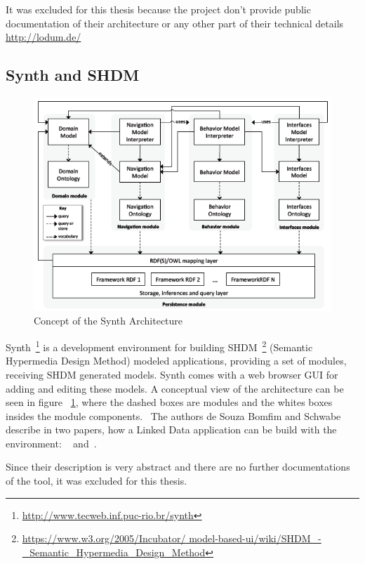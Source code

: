 It was excluded for this thesis because the project don't provide public 
documentation of their architecture or any other part of their technical details
\url{http://lodum.de/}

\subsection{Synth and SHDM}

\begin{figure}[htbp]
	\centering
\includegraphics[width=\textwidth]{img/synth-concept.png}
	\caption{Concept of the Synth Architecture}
	\label{synth_concept}
\end{figure}

Synth~\footnote{\url{http://www.tecweb.inf.puc-rio.br/synth}} is a development 
environment for building SHDM~\footnote{\url{https://www.w3.org/2005/Incubator/
model-based-ui/wiki/SHDM_-_Semantic_Hypermedia_Design_Method}} (Semantic 
Hypermedia Design Method) modeled applications, providing a set of modules, 
receiving SHDM generated models. Synth comes with a web browser GUI for adding and 
editing these models. A conceptual view of the architecture can be seen in figure~
\ref{synth_concept}, where the dashed boxes are modules and the whites boxes 
insides the module components.~\cite{desynth} The authors de Souza Bomfim and 
Schwabe describe in two papers, how a Linked Data application can be build with 
the environment: ~\cite{desynth} and~\cite{de2011design}.

Since their description is very abstract and there are no further documentations 
of the tool, it was excluded for this thesis. 